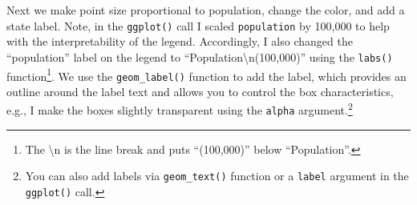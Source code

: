 \documentclass[]{krantz}
\makeatletter
\newenvironment{Shaded}{\begin{snugshade}}{\end{snugshade}}
\newcommand{\KeywordTok}[1]{\textcolor[rgb]{0.27,0.27,0.27}{\textbf{#1}}}
\newcommand{\DataTypeTok}[1]{\textcolor[rgb]{0.27,0.27,0.27}{#1}}
\newcommand{\DecValTok}[1]{\textcolor[rgb]{0.06,0.06,0.06}{#1}}
\newcommand{\FloatTok}[1]{\textcolor[rgb]{0.06,0.06,0.06}{#1}}
\newcommand{\CharTok}[1]{\textcolor[rgb]{0.5,0.5,0.5}{#1}}
\newcommand{\StringTok}[1]{\textcolor[rgb]{0.5,0.5,0.5}{#1}}
\newcommand{\OperatorTok}[1]{\textcolor[rgb]{0.43,0.43,0.43}{\textbf{#1}}}
\newcommand{\NormalTok}[1]{#1}
\newenvironment{kframe}{%
\medskip{}
\setlength{\fboxsep}{.8em}
 \def\at@end@of@kframe{}%
 \ifinner\ifhmode%
  \def\at@end@of@kframe{\end{minipage}}%
  \begin{minipage}{\columnwidth}%
 \fi\fi%
 \def\FrameCommand##1{\hskip\@totalleftmargin \hskip-\fboxsep
 \colorbox{shadecolor}{##1}\hskip-\fboxsep
     \hskip-\linewidth \hskip-\@totalleftmargin \hskip\columnwidth}%
 \MakeFramed {\advance\hsize-\width
   \@totalleftmargin\z@ \linewidth\hsize
   \@setminipage}}%
 {\par\unskip\endMakeFramed%
 \at@end@of@kframe}
\renewenvironment{Shaded}{\begin{kframe}}{\end{kframe}}
\makeatother
\begin{document}
Next we make point size proportional to population, change the color,
and add a state label. Note, in the \texttt{ggplot()} call I scaled
\texttt{population} by 100,000 to help with the interpretability of the
legend. Accordingly, I also changed the ``population'' label on the
legend to ``Population\textbackslash{}n(100,000)'' using the
\texttt{labs()} function\footnote{The \textbackslash{}n is the line
  break and puts ``(100,000)'' below ``Population''.}. We use the
\texttt{geom\_label()} function to add the label, which provides an
outline around the label text and allows you to control the box
characteristics, e.g., I make the boxes slightly transparent using the
\texttt{alpha} argument.\footnote{You can also add labels via
  \texttt{geom\_text()} function or a \texttt{label} argument in the
  \texttt{ggplot()} call.}

\begin{Shaded}
\end{Shaded}
\end{document}
